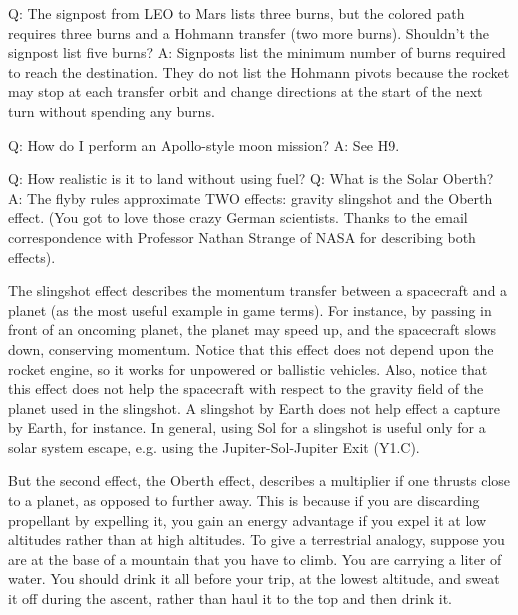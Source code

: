 \documentclass[a4paper]{book}
\begin{document}
Q: The signpost from LEO to Mars lists three burns, but the colored path requires three burns and a Hohmann transfer (two more burns). Shouldn't the signpost list five burns?
A: Signposts list the minimum number of burns required to reach the destination. They do not list the Hohmann pivots because the rocket may stop at each transfer orbit and change directions at the start of the next turn without spending any burns.

Q: How do I perform an Apollo-style moon mission?
A: See H9.

Q: How realistic is it to land without using fuel?
%
Q: What is the Solar Oberth?
A: The flyby rules approximate TWO effects: gravity slingshot and the Oberth effect. (You got to love those crazy German scientists. Thanks to the email correspondence with Professor Nathan Strange of NASA for describing both effects).

The slingshot effect describes the momentum transfer between a spacecraft and a planet (as the most useful example in game terms). For instance, by passing in front of an oncoming planet, the planet may speed up, and the spacecraft slows down, conserving momentum. Notice that this effect does not depend upon the rocket engine, so it works for unpowered or ballistic vehicles. Also, notice that this effect does not help the spacecraft with respect to the gravity field of the planet used in the slingshot. A slingshot by Earth does not help effect a capture by Earth, for instance. In general, using Sol for a slingshot is useful only for a solar system escape, e.g. using the Jupiter-Sol-Jupiter Exit (Y1.C).

But the second effect, the Oberth effect, describes a multiplier if one thrusts close to a planet, as opposed to further away. This is because if you are discarding propellant by expelling it, you gain an energy advantage if you expel it at low altitudes rather than at high altitudes. To give a terrestrial analogy, suppose you are at the base of a mountain that you have to climb. You are carrying a liter of water. You should drink it all before your trip, at the lowest altitude, and sweat it off during the ascent, rather than haul it to the top and then drink it.
\end{document}
